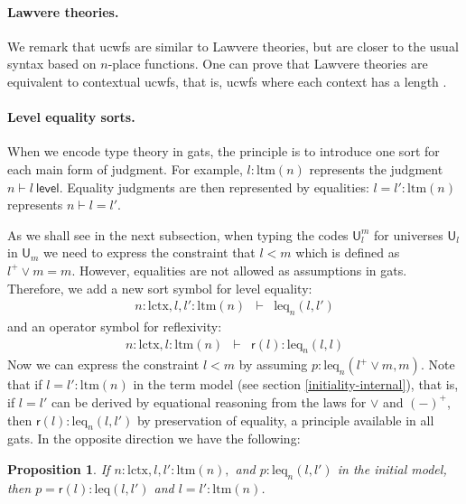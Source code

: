 \documentclass[submission,copyright,creativecommons]{eptcs}
\newtheorem*{proposition*}{Proposition}%
\newcommand{\UU}{\mathsf{U}}
\newcommand{\level}{\mathsf{level}}
\newcommand{\refl}{\mathsf{r}}
\def\UU{\mathsf{U}}
\def\lctx{\mathrm{lctx}}
\def\ltm{\mathrm{ltm}}
\def\leq{\mathrm{leq}}
\begin{document}
\paragraph{Lawvere theories.} We remark that ucwfs are similar to Lawvere theories, but are closer to the usual syntax based on $n$-place functions. One can prove that Lawvere theories are equivalent to contextual ucwfs, that is, ucwfs where each context has a length \cite{ClairambaultD14,castellan:lambek}.

\paragraph{Level equality sorts.}
When we encode type theory in gats, the principle is to introduce one sort for each main form of judgment. For example, $l : \ltm(n)$ represents the judgment $n \vdash l\ \level$. Equality judgments are then represented by equalities: $l = l' : \ltm(n)$ represents $n \vdash l = l'$.

As we shall see in the next subsection, when typing the codes $\UU_l^m$ for universes $\UU_l$ in $\UU_m$ we need to express the constraint that $l < m$ which is defined as $l^+ \vee m = m$. However, equalities are not allowed as assumptions in gats. Therefore, we add a new sort symbol for level equality:
\begin{eqnarray*}
n : \lctx, l, l'  : \ltm(n) &\vdash& \leq_n(l,l')
\end{eqnarray*}
and an operator symbol for reflexivity:
\begin{eqnarray*}
n : \lctx, l : \ltm(n) &\vdash& \refl(l) :  \leq_n(l,l)
\end{eqnarray*}
Now we can express the constraint $l < m$ by assuming $p : \leq_n(l^+ \vee m, m)$. Note that if $l =  l' : \ltm(n)$ in the term model (see section \ref{initiality-internal}), that is, if $l = l'$ can be derived by equational reasoning from the laws for $\vee$ and $(-)^+$, then $\refl(l) :  \leq_n(l,l')$
by preservation of equality, a principle available in all gats. In the opposite direction we have the following:
\begin{proposition*}
If $n : \lctx, l, l' : \ltm(n),$ and $p :  \leq_n(l,l')$ in the initial model,
then $p = \refl(l) : \leq(l,l')$ and $l = l' : \ltm(n)$.
\end{proposition*}
\end{document}
